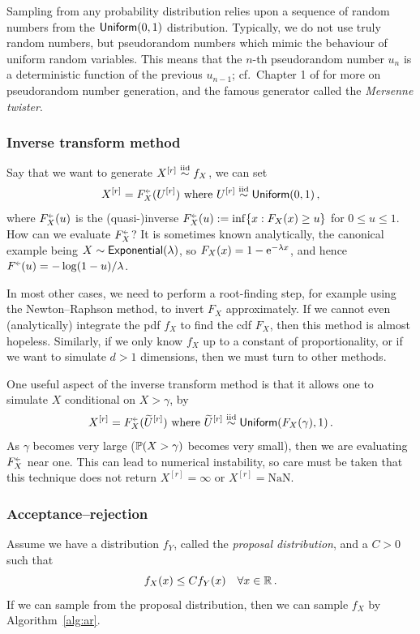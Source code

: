 Sampling from any probability distribution relies upon a sequence of random numbers from the $\mathsf{Uniform}(0,1)$ distribution. Typically, we do not use truly random numbers, but pseudorandom numbers which mimic the behaviour of uniform random variables. This means that the $n$-th pseudorandom number $u_n$ is a deterministic function of the previous $u_{n-1}$; cf.\ Chapter 1 of \cite{kroese2013handbook} for more on pseudorandom number generation, and the famous generator called the \emph{Mersenne twister}.

\subsubsection{Inverse transform method}

Say that we want to generate $X^{[r]} \overset{\smash{\mathrm{iid}}}{\sim} f_X$, we can set
\[ X^{[r]} = F_X^{\ginv}(U^{[r]}) \text{ where } U^{[r]} \iidDist \UnifDist(0,1) \,, \]
where $F_X^{\ginv}(u)$ is the (quasi-)inverse
$ F_X^{\ginv}(u) \defeq \inf \{ x : F_X(x) \ge u \}  $ for $0 \le u \le 1$.
How can we evaluate $F_X^{\ginv}$? It is sometimes known analytically, the canonical example being $X \sim \mathsf{Exponential}(\lambda)$, so $F_X(x)=1 - \mathrm{e}^{-\lambda x}$, and hence $F^{\ginv}(u) = -\log(1-u)/\lambda$.

In most other cases, we need to perform a root-finding step, for example using the Newton--Raphson method, to invert $F_X$ approximately. If we cannot even (analytically) integrate the pdf $f_X$ to find the cdf $F_X$, then this method is almost hopeless. Similarly, if we only know $f_X$ up to a constant of proportionality, or if we want to simulate $d>1$ dimensions, then we must turn to other methods.

One useful aspect of the inverse transform method is that it allows one to simulate $X$ conditional on $X > \gamma$, by
\[ X^{[r]} = F_X^{\ginv}(\tilde{U}^{[r]}) \text{ where } \tilde{U}^{[r]} \iidDist \UnifDist( F_X(\gamma), 1 ) \,. \]
As $\gamma$ becomes very large ($\operatorname{{\mathbb P}}(X > \gamma)$ becomes very small), then we are evaluating $F_X^{\ginv}$ near one. This can lead to numerical instability, so care must be taken that this technique does not return $X^{[r]} = \infty$ or $X^{[r]} = \mathrm{NaN}$.

\subsubsection{Acceptance--rejection}

Assume we have a distribution $f_Y$, called the \emph{proposal distribution}, and a $C > 0$ such that
\begin{equation} \label{ar-bound}
f_X(x) \le C f_Y(x) \quad \forall x \in \mathbb{R} \,.
\end{equation}
If we can sample from the proposal distribution, then we can sample $f_X$ by Algorithm~\ref{alg:ar}.

